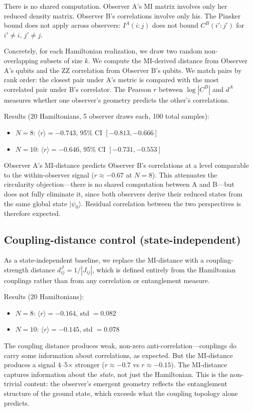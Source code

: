 \documentclass[aps,pra,twocolumn,superscriptaddress]{revtex4-2}
\begin{document}
There is no shared computation. Observer A's MI matrix involves only her reduced density matrix. Observer B's correlations involve only his. The Pinsker bound does not apply across observers: $I^A(i{:}j)$ does not bound $C^B(i'{:}j')$ for $i' \neq i$, $j' \neq j$.

Concretely, for each Hamiltonian realization, we draw two random non-overlapping subsets of size $k$. We compute the MI-derived distance from Observer A's qubits and the ZZ correlation from Observer B's qubits. We match pairs by rank order: the closest pair under A's metric is compared with the most correlated pair under B's correlator. The Pearson $r$ between $\log|C^B|$ and $d^A$ measures whether one observer's geometry predicts the other's correlations.

Results (20 Hamiltonians, 5 observer draws each, 100 total samples):
\begin{itemize}
\item $N = 8$: $\langle r \rangle = -0.743$, 95\% CI $[-0.813, -0.666]$
\item $N = 10$: $\langle r \rangle = -0.646$, 95\% CI $[-0.731, -0.553]$
\end{itemize}
Observer A's MI-distance predicts Observer B's correlations at a level comparable to the within-observer signal ($r \approx -0.67$ at $N = 8$). This attenuates the circularity objection---there is no shared computation between A and B---but does not fully eliminate it, since both observers derive their reduced states from the same global state $|\psi_0\rangle$. Residual correlation between the two perspectives is therefore expected.

\subsection{Coupling-distance control (state-independent)}

As a state-independent baseline, we replace the MI-distance with a coupling-strength distance $d^J_{ij} = 1/|J_{ij}|$, which is defined entirely from the Hamiltonian couplings rather than from any correlation or entanglement measure.

Results (20 Hamiltonians):
\begin{itemize}
\item $N = 8$: $\langle r \rangle = -0.164$, std $= 0.082$
\item $N = 10$: $\langle r \rangle = -0.145$, std $= 0.078$
\end{itemize}
The coupling distance produces weak, non-zero anti-correlation---couplings do carry some information about correlations, as expected. But the MI-distance produces a signal 4--5$\times$ stronger ($r \approx -0.7$ vs $r \approx -0.15$). The MI-distance captures information about the \emph{state}, not just the Hamiltonian. This is the non-trivial content: the observer's emergent geometry reflects the entanglement structure of the ground state, which exceeds what the coupling topology alone predicts.
\end{document}
